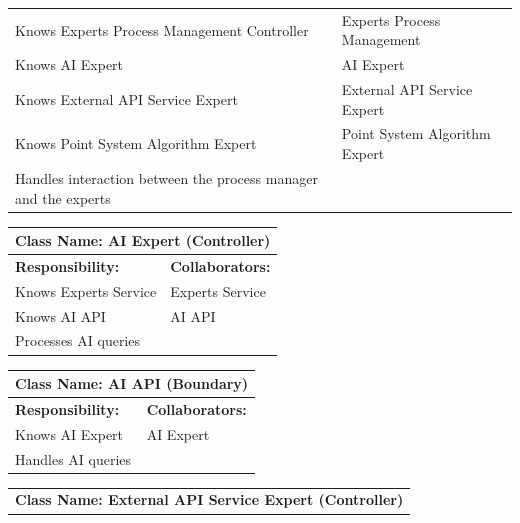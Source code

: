 \documentclass[]{article}
\begin{document}
\begin{itemize}
\begin{table}[H]
\begin{tabular}{|p{6cm}|p{6cm}|}
            Knows Experts Process Management Controller & Experts Process Management \\
            Knows AI Expert & AI Expert \\
            Knows External API Service Expert & External API Service Expert \\
            Knows Point System Algorithm Expert & Point System Algorithm Expert \\
            Handles interaction between the process manager and the experts & \\
            \hline
            \end{tabular}
        \end{table}
        \begin{table}[H]
            \centering
            \begin{tabular}{|p{6cm}|p{6cm}|}
            \hline 
             \multicolumn{2}{|l|}{\textbf{Class Name: AI Expert (Controller)}} \\
            \hline
            \textbf{Responsibility:} & \textbf{Collaborators:} \\
            \hline
            Knows Experts Service & Experts Service \\
            Knows AI API & AI API \\
            Processes AI queries & \\
            \hline
            \end{tabular}
        \end{table}     
        \begin{table}[H]
            \centering
            \begin{tabular}{|p{6cm}|p{6cm}|}
            \hline 
             \multicolumn{2}{|l|}{\textbf{Class Name: AI API (Boundary)}} \\
            \hline
            \textbf{Responsibility:} & \textbf{Collaborators:} \\
            \hline
            Knows AI Expert & AI Expert \\
            Handles AI queries & \\
            \hline
            \end{tabular}
        \end{table}
        \begin{table}[H]
            \centering
            \begin{tabular}{|p{6cm}|p{6cm}|}
            \hline 
             \multicolumn{2}{|l|}{\textbf{Class Name: External API Service Expert (Controller)}} \\

\end{tabular}
\end{table}
\end{itemize}
\end{document}
